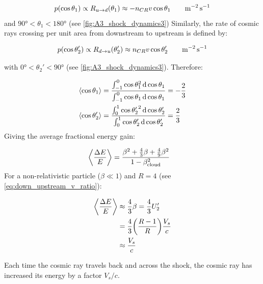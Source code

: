 \begin{equation}
    \begin{aligned}
        p\qty(\cos\theta_1)\propto R_{u\rightarrow d}\qty(\theta_1)&\approx-n_{CR}v\cos\theta_1\quad &\si{\per\meter\squared\per\second}
    \end{aligned}
\end{equation}
\noindent and $\ang{90}<\theta_1<\ang{180}$ (see \autoref{fig:A3_shock_dynamics3}) Similarly, the rate of cosmic rays crossing per unit area from downstream to upstream is defined by:

\begin{equation}
    \begin{aligned}
p\qty(\cos\theta_2')\propto R_{d\rightarrow u}\qty(\theta_2')&\approx n_{CR}v\cos\theta_2'\quad&\si{\per\meter\squared\per\second} 
    \end{aligned}
\end{equation}

\noindent with $\ang{0}<\theta_2'<\ang{90}$ (see \autoref{fig:A3_shock_dynamics3}). Therefore:

\begin{equation}
    \begin{aligned}
    \left\langle \cos\theta_1 \right\rangle&=\frac{\int_{-1}^{0} \cos\theta_1^2\dd{\cos\theta_1}}{\int_{-1}^{0}\cos\theta_1 \dd{\cos\theta_1}}=-\frac{2}{3} \\
    \left\langle \cos\theta_2' \right\rangle&=\frac{\int_{0}^{1} {\cos\theta_2'}^2\dd{\cos\theta_2'}}{\int_{0}^{1}\cos\theta_2' \dd{\cos\theta_2'}}=\frac{2}{3}
    \end{aligned} 
\end{equation}
\noindent Giving the average fractional energy gain:

\begin{equation}
    \begin{aligned}
    \left\langle \frac{\Delta E}{E} \right\rangle
	&=\frac{\beta^2+\frac{4}{3}\beta+\frac{4}{9}\beta^2}{1-\beta_\text{cloud}^2}
    \end{aligned} 
\end{equation}
\noindent For a non-relativistic particle ($\beta\ll 1$) and $R=4$ (see \autoref{eq:down_upstream_v_ratio}):

\begin{equation}
    \begin{aligned}
    \left\langle \frac{\Delta E}{E} \right\rangle
	&\approx \frac{4}{3}\beta =\frac{4}{3}U_2'  \\
    &=\frac{4}{3}\qty(\frac{R-1}{R})\frac{V_s}{c} \\
    &\approx \frac{V_s}{c}
    \end{aligned} 
\end{equation}

Each time the cosmic ray travels back and across the shock, the cosmic ray has increased its energy by a factor $V_s/c$.